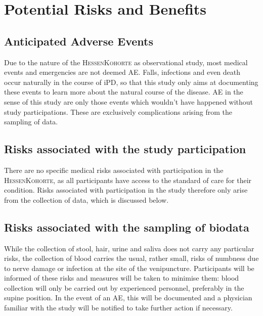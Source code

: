 \section{Potential Risks and Benefits}
\subsection{Anticipated Adverse Events}
\label{subsec:anticipated_AE}
Due to the nature of the \textsc{HessenKohorte} as observational study, most medical events and emergencies are not deemed \acl{AE}. Falls, infections and even death occur naturally in the course of \ac{iPD}, so that this study only aims at documenting these events to learn more about the natural course of the disease. \ac{AE} in the sense of this study are only those events which wouldn't have happened without study participations. These are exclusively complications arising from the sampling of data.

\subsection{Risks associated with the study participation}
There are no specific medical risks associated with participation in the \textsc{HessenKohorte}, as all participants have access to the standard of care for their condition. Risks associated with participation in the study therefore only arise from the collection of data, which is discussed below.

\subsection{Risks associated with the sampling of biodata}
While the collection of stool, hair, urine and saliva does not carry any particular risks, the collection of blood carries the usual, rather small, risks of numbness due to nerve damage or infection at the site of the venipuncture. Participants will be informed of these risks and measures will be taken to minimise them: blood collection will only be carried out by experienced personnel, preferably in the supine position. In the event of an \ac{AE}, this will be documented and a physician familiar with the study will be notified to take further action if necessary.

